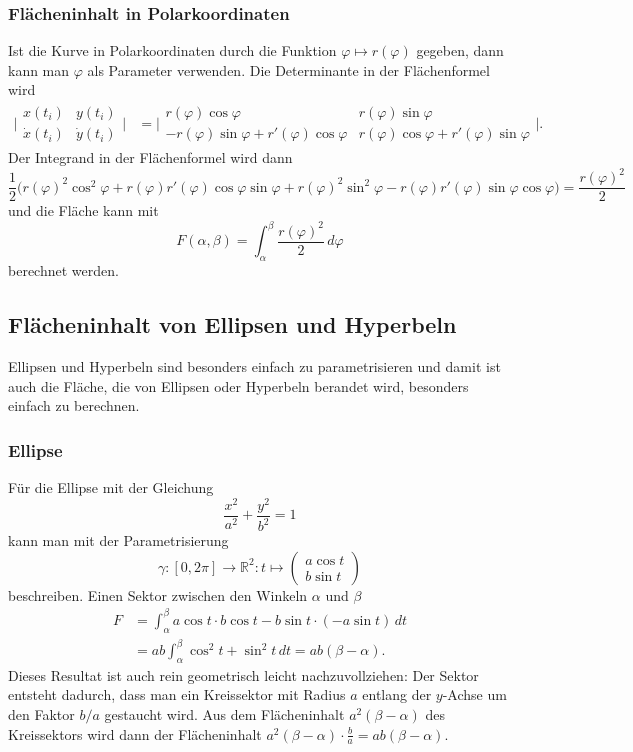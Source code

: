 \subsubsection{Flächeninhalt in Polarkoordinaten}
Ist die Kurve in Polarkoordinaten durch die Funktion
$\varphi\mapsto r(\varphi)$ gegeben, dann kann man $\varphi$ als
Parameter verwenden.
Die Determinante in der Flächenformel wird
\begin{align*}
\biggl|
\begin{matrix}
x(t_i)& y(t_i)\\
\dot{x}(t_i)& \dot{y}(t_i)
\end{matrix}
\biggr|
&=
\biggl|
\begin{matrix}
r(\varphi)\cos\varphi&r(\varphi)\sin\varphi\\
-r(\varphi)\sin\varphi+r'(\varphi)\cos\varphi
	&r(\varphi)\cos\varphi+r'(\varphi)\sin\varphi
\end{matrix}
\biggr|.
\end{align*}
Der Integrand in der Flächenformel wird dann
\[
\frac12\bigl(
r(\varphi)^2 \cos^2\varphi +r(\varphi)r'(\varphi)\cos\varphi\sin\varphi
+
r(\varphi)^2 \sin^2\varphi -r(\varphi)r'(\varphi)\sin\varphi\cos\varphi
\bigr)
=
\frac{r(\varphi)^2}2
\]
und die Fläche kann mit
\[
F(\alpha,\beta)=\int_\alpha^\beta \frac{r(\varphi)^2}{2}\,d\varphi
\]
berechnet werden.

\subsection{Flächeninhalt von Ellipsen und Hyperbeln}
Ellipsen und Hyperbeln sind besonders einfach zu parametrisieren und
damit ist auch die Fläche, die von Ellipsen oder Hyperbeln berandet
wird, besonders einfach zu berechnen.

\subsubsection{Ellipse}
Für die Ellipse mit der Gleichung
\[
\frac{x^2}{a^2}+\frac{y^2}{b^2}=1
\]
kann man mit der Parametrisierung
\[
\gamma\colon
[0,2\pi] \to \mathbb{R}^2
:
t \mapsto \begin{pmatrix}a\cos t\\ b\sin t\end{pmatrix}
\]
beschreiben.
Einen Sektor zwischen den Winkeln $\alpha$ und $\beta$
\begin{align*}
F
&=
\int_\alpha^\beta a\cos t \cdot b\cos t-b\sin t\cdot (-a\sin t)\,dt
\\
&=
ab
\int_\alpha^\beta \cos^2 t + \sin^2 t\,dt
=ab(\beta-\alpha).
\end{align*}
Dieses Resultat ist auch rein geometrisch leicht nachzuvollziehen:
Der Sektor entsteht dadurch, dass man ein Kreissektor mit Radius $a$
entlang der $y$-Achse um den Faktor $b/a$ gestaucht wird.
Aus dem Flächeninhalt $a^2(\beta-\alpha)$ des Kreissektors wird dann
der Flächeninhalt $a^2(\beta-\alpha)\cdot \frac{b}{a}=ab(\beta-\alpha)$.


